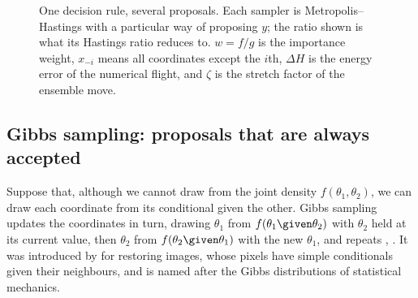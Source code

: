 \begin{figure}[htbp]
\centering
{}
\caption{One decision rule, several proposals. Each sampler is Metropolis--Hastings with a
particular way of proposing $y$; the ratio shown is what its Hastings ratio reduces to. $w=f/g$ is
the importance weight, $x_{-i}$ means all coordinates except the $i$th, $\Delta H$ is the energy
error of the numerical flight, and $\zeta$ is the stretch factor of the ensemble move.}
\label{9b:fig:family}
\end{figure}

\subsection{Gibbs sampling: proposals that are always accepted}
\label{9b:sec:gibbs}

Suppose that, although we cannot draw from the joint density $f(\theta_1,\theta_2)$, we can draw
each coordinate from its conditional given the other. Gibbs sampling updates the coordinates in
turn, drawing $\theta_1$ from $f(\theta_1\given\theta_2)$ with $\theta_2$ held at its current
value, then $\theta_2$ from $f(\theta_2\given\theta_1)$ with the new $\theta_1$, and repeats
, . It was introduced by \textcite{GemanGeman1984} for
restoring images, whose pixels have simple conditionals given their neighbours, and is named after
the Gibbs distributions of statistical mechanics.

